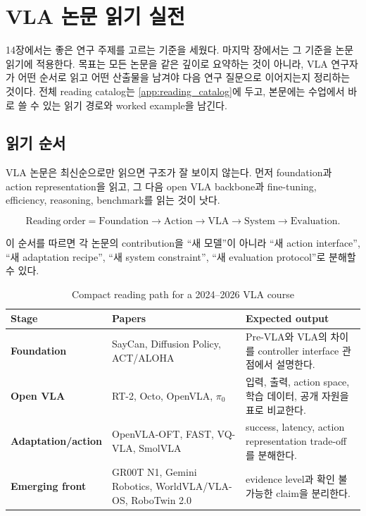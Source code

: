 \chapter{VLA 논문 읽기 실전}
\label{ch:paper_reading_practice}

14장에서는 좋은 연구 주제를 고르는 기준을 세웠다. 마지막 장에서는 그 기준을 논문 읽기에 적용한다. 목표는 모든 논문을 같은 깊이로 요약하는 것이 아니라, VLA 연구자가 어떤 순서로 읽고 어떤 산출물을 남겨야 다음 연구 질문으로 이어지는지 정리하는 것이다. 전체 reading catalog는 \cref{app:reading_catalog}에 두고, 본문에는 수업에서 바로 쓸 수 있는 읽기 경로와 worked example을 남긴다.

\section{읽기 순서}

VLA 논문은 최신순으로만 읽으면 구조가 잘 보이지 않는다. 먼저 foundation과 action representation을 읽고, 그 다음 open VLA backbone과 fine-tuning, efficiency, reasoning, benchmark를 읽는 것이 낫다.

\begin{equation}
  \mathrm{Reading\ order}
  =
  \mathrm{Foundation}
  \rightarrow
  \mathrm{Action}
  \rightarrow
  \mathrm{VLA}
  \rightarrow
  \mathrm{System}
  \rightarrow
  \mathrm{Evaluation}.
\end{equation}

이 순서를 따르면 각 논문의 contribution을 ``새 모델''이 아니라 ``새 action interface'', ``새 adaptation recipe'', ``새 system constraint'', ``새 evaluation protocol''로 분해할 수 있다.

\begin{table}[t]
  \centering
  \caption{Compact reading path for a 2024--2026 VLA course}
  \label{tab:compact_reading_path}
  \begin{tabularx}{\textwidth}{>{\bfseries}p{30mm}p{58mm}X}
    \toprule
    Stage & Papers & Expected output \\
    \midrule
    Foundation & SayCan, Diffusion Policy, ACT/ALOHA & Pre-VLA와 VLA의 차이를 controller interface 관점에서 설명한다. \\
    Open VLA & RT-2, Octo, OpenVLA, \(\pi_0\) & 입력, 출력, action space, 학습 데이터, 공개 자원을 표로 비교한다. \\
    Adaptation/action & OpenVLA-OFT, FAST, VQ-VLA, SmolVLA & success, latency, action representation trade-off를 분해한다. \\
    Emerging front & GR00T N1, Gemini Robotics, WorldVLA/VLA-OS, RoboTwin 2.0 & evidence level과 확인 불가능한 claim을 분리한다. \\
    \bottomrule
  \end{tabularx}
\end{table}

